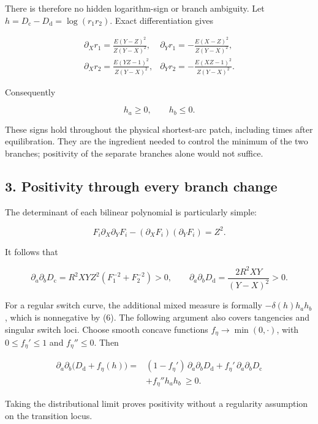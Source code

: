 \documentclass[11pt]{article}
\begin{document}
There is therefore no hidden logarithm-sign or branch ambiguity. Let
\(h=D_{\mathrm c}-D_{\mathrm d}=\log(r_1r_2)\). Exact differentiation
gives

\[
\begin{array}{ll}
\displaystyle \partial_Xr_1=\frac{E(Y-Z)^2}{Z(Y-X)^2},&
\displaystyle \partial_Yr_1=-\frac{E(X-Z)^2}{Z(Y-X)^2},\\[6pt]
\displaystyle \partial_Xr_2=\frac{E(YZ-1)^2}{Z(Y-X)^2},&
\displaystyle \partial_Yr_2=-\frac{E(XZ-1)^2}{Z(Y-X)^2}.
\end{array}
\tag{5}
\]

Consequently

\[
h_a\ge0,\qquad h_b\le0.
\tag{6}
\]

These signs hold throughout the physical shortest-arc patch, including
times after equilibration. They are the ingredient needed to control the
minimum of the two branches; positivity of the separate branches alone
would not suffice.

\subsection{3. Positivity through every branch
change}\label{positivity-through-every-branch-change}

The determinant of each bilinear polynomial is particularly simple:

\[
F_i\partial_X\partial_YF_i
 -(\partial_XF_i)(\partial_YF_i)=Z^2.
\tag{7}
\]

It follows that

\[
\partial_a\partial_b D_{\mathrm c}
 =R^2XY Z^2(F_1^{-2}+F_2^{-2})>0,
\qquad
\partial_a\partial_b D_{\mathrm d}
 =\frac{2R^2XY}{(Y-X)^2}>0.
\tag{8}
\]

For a regular switch curve, the additional mixed measure is formally
\(-\delta(h)h_ah_b\), which is nonnegative by (6). The following
argument also covers tangencies and singular switch loci. Choose smooth
concave functions \(f_\eta\to\min(0,\cdot)\), with \(0\le f_\eta'\le1\)
and \(f_\eta''\le0\). Then

\[
\begin{aligned}
\partial_a\partial_b\bigl(D_{\mathrm d}+f_\eta(h)\bigr)
={}&(1-f_\eta')\,\partial_a\partial_bD_{\mathrm d}
 +f_\eta'\,\partial_a\partial_bD_{\mathrm c}\\
 &+f_\eta''h_ah_b\ \ge0.
\end{aligned}
\tag{9}
\]

Taking the distributional limit proves positivity without a regularity
assumption on the transition locus.
\end{document}
